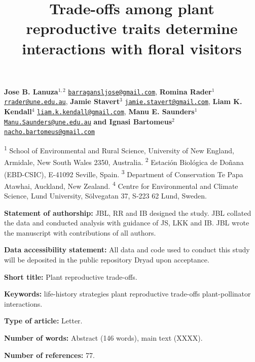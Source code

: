 \documentclass[
  12pt,
  a4paper,
]{article}
\title{\singlespacing \vspace{-1.6cm} \LARGE Trade-offs among plant reproductive traits determine interactions with floral visitors}
\author{}
\date{\vspace{-2.5em}}
\begin{document}
\maketitle

\vspace{-1.4cm}

\singlespacing

\textbf{Jose B. Lanuza$^{1,2}$} \href{mailto:barragansljose@gmail.com}{\nolinkurl{barragansljose@gmail.com}}, \textbf{Romina Rader$^{1}$} \href{mailto:rrader@une.edu.au}{\nolinkurl{rrader@une.edu.au}}, \textbf{Jamie Stavert$^{3}$} \href{mailto:jamie.stavert@gmail.com}{\nolinkurl{jamie.stavert@gmail.com}}, \textbf{Liam K. Kendall$^{4}$} \href{mailto:liam.k.kendall@gmail.com}{\nolinkurl{liam.k.kendall@gmail.com}}, \textbf{Manu E. Saunders$^{1}$} \href{mailto:Manu.Saunders@une.edu.au}{\nolinkurl{Manu.Saunders@une.edu.au}} \textbf{and Ignasi Bartomeus$^{2}$} \href{mailto:nacho.bartomeus@gmail.com}{\nolinkurl{nacho.bartomeus@gmail.com}}

\small

\textsuperscript{1} School of Environmental and Rural Science, University of New England, Armidale, New South Wales 2350, Australia. \textsuperscript{2} Estación Biológica de Doñana (EBD-CSIC), E-41092 Seville, Spain. \textsuperscript{3} Department of Conservation \textbar{} Te Papa Atawhai, Auckland, New Zealand. \textsuperscript{4} Centre for Environmental and Climate Science, Lund University, Sölvegatan 37, S-223 62 Lund, Sweden.

\doublespacing
\normalsize

\textbf{Statement of authorship:} JBL, RR and IB designed the study. JBL collated the data and conducted analysis with guidance of JS, LKK and IB. JBL wrote the manuscript with contributions of all authors.

\textbf{Data accessibility statement:} All data and code used to conduct this study will be deposited in the public repository Dryad upon acceptance.

\textbf{Short title:} Plant reproductive trade-offs.

\textbf{Keywords:} life-history strategies \textbar{} plant reproductive trade-offs \textbar{} plant-pollinator interactions.

\textbf{Type of article:} Letter.

\textbf{Number of words:} Abstract (146 words), main text (XXXX).

\textbf{Number of references:} 77.
\end{document}
